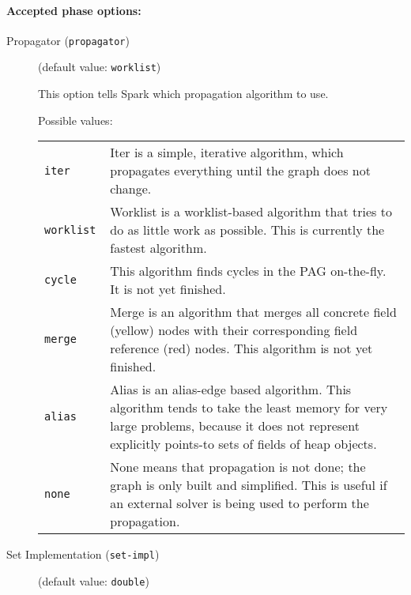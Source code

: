 \documentclass{article}
\begin{document}
\paragraph{Accepted phase options:} 

\begin{description}

\item[Propagator ({\tt propagator})]
(default value: {\tt worklist})




This option tells Spark which propagation algorithm to use.
        



Possible values:\\
\begin{longtable}{p{1in}p{4in}}

{\tt iter }
&

Iter is a simple, iterative algorithm, which propagates everything until the
graph does not change.
\\

{\tt worklist }
&

Worklist is a worklist-based algorithm that tries
to do as little work as possible. This is currently the fastest algorithm.
\\

{\tt cycle }
&
This algorithm finds cycles in the PAG on-the-fly. It is not yet finished.\\

{\tt merge }
&

Merge is an algorithm that merges all concrete field (yellow) nodes with their corresponding
field reference (red) nodes. This algorithm is not yet finished.
\\

{\tt alias }
&

Alias is an alias-edge based algorithm. This algorithm tends to take
the least memory for very large problems, because it does not represent
explicitly points-to sets of fields of heap objects.
\\

{\tt none }
&

None means that propagation is not done; the graph is only built and
simplified. This is useful if an external solver is being used to perform the
propagation.
\\

\end{longtable}


\item[Set Implementation ({\tt set-impl})]
(default value: {\tt double})





\end{description}
\end{document}
